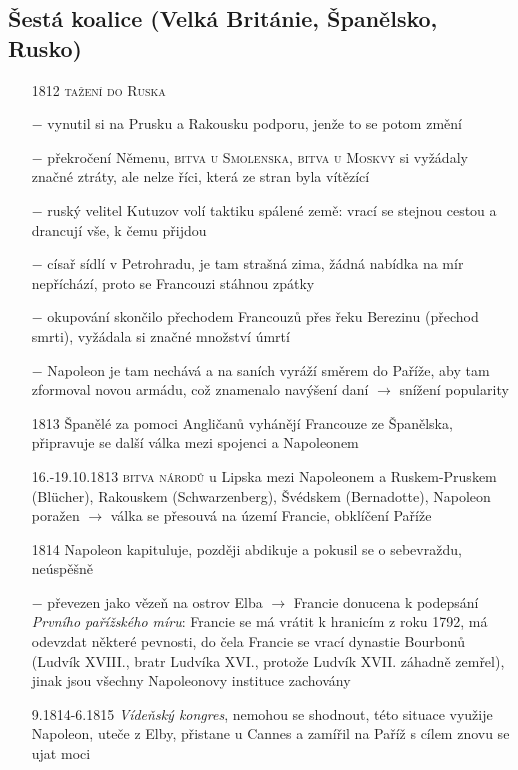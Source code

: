 \documentclass{article}
\begin{document}
\subsection*{Šestá koalice (Velká Británie, Španělsko, Rusko)}
\begin{itemize}
    \vspace{-0.5em}
    \setlength\itemsep{0.15em}
    \item[1812] \textsc{tažení do Ruska}
    \item[$-$] vynutil si na Prusku a Rakousku podporu, jenže to se potom změní
    \item[$-$] překročení Němenu, \textsc{bitva u Smolenska}, \textsc{bitva u Moskvy} si vyžádaly značné ztráty, ale nelze říci, která ze stran byla vítězící
    \item[$-$] ruský velitel Kutuzov volí taktiku spálené země: vrací se stejnou cestou a drancují vše, k čemu přijdou
    \item[$-$] císař sídlí v Petrohradu, je tam strašná zima, žádná nabídka na mír nepříchází, proto se Francouzi stáhnou zpátky
    \item[$-$] okupování skončilo přechodem Francouzů přes řeku Berezinu (přechod smrti), vyžádala si značné množství úmrtí
    \item[$-$] Napoleon je tam nechává a na saních vyráží směrem do Paříže, aby tam zformoval novou armádu, což znamenalo navýšení daní $\rightarrow$ snížení popularity
    \item[1813] Španělé za pomoci Angličanů vyhánějí Francouze ze Španělska, připravuje se další válka mezi spojenci a Napoleonem
    \item[16.-19.10.1813] \textsc{bitva národů} u Lipska mezi Napoleonem a Ruskem-Pruskem (Blücher), Rakouskem (Schwarzenberg), Švédskem (Bernadotte), Napoleon poražen $\rightarrow$ válka se přesouvá na území Francie, obklíčení Paříže
    \item[1814] Napoleon kapituluje, později abdikuje a pokusil se o sebevraždu, neúspěšně
    \item[$-$] převezen jako vězeň na ostrov Elba $\rightarrow$ Francie donucena k podepsání \textit{Prvního pařížského míru}: Francie se má vrátit k hranicím z roku 1792, má odevzdat některé pevnosti, do čela Francie se vrací dynastie Bourbonů (Ludvík XVIII., bratr Ludvíka XVI., protože Ludvík XVII. záhadně zemřel), jinak jsou všechny Napoleonovy instituce zachovány
    \item[9.1814-6.1815] \textit{Vídeňský kongres}, nemohou se shodnout, této situace využije Napoleon, uteče z Elby, přistane u Cannes a zamířil na Paříž s cílem znovu se ujat moci

\end{itemize}
\end{document}
